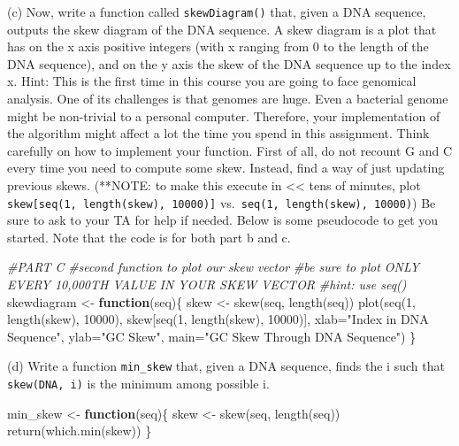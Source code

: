 \documentclass[
]{article}
\newenvironment{Shaded}{\begin{snugshade}}{\end{snugshade}}
\newcommand{\AttributeTok}[1]{\textcolor[rgb]{0.77,0.63,0.00}{#1}}
\newcommand{\CommentTok}[1]{\textcolor[rgb]{0.56,0.35,0.01}{\textit{#1}}}
\newcommand{\ControlFlowTok}[1]{\textcolor[rgb]{0.13,0.29,0.53}{\textbf{#1}}}
\newcommand{\DecValTok}[1]{\textcolor[rgb]{0.00,0.00,0.81}{#1}}
\newcommand{\FunctionTok}[1]{\textcolor[rgb]{0.00,0.00,0.00}{#1}}
\newcommand{\NormalTok}[1]{#1}
\newcommand{\OtherTok}[1]{\textcolor[rgb]{0.56,0.35,0.01}{#1}}
\newcommand{\StringTok}[1]{\textcolor[rgb]{0.31,0.60,0.02}{#1}}
\begin{document}
(c) Now, write a function called \texttt{skewDiagram()} that, given a
DNA sequence, outputs the skew diagram of the DNA sequence. A skew
diagram is a plot that has on the x axis positive integers (with x
ranging from 0 to the length of the DNA sequence), and on the y axis the
skew of the DNA sequence up to the index x. Hint: This is the first time
in this course you are going to face genomical analysis. One of its
challenges is that genomes are huge. Even a bacterial genome might be
non-trivial to a personal computer. Therefore, your implementation of
the algorithm might affect a lot the time you spend in this assignment.
Think carefully on how to implement your function. First of all, do not
recount G and C every time you need to compute some skew. Instead, find
a way of just updating previous skews. (**NOTE: to make this execute in
\textless\textless{} tens of minutes, plot
\texttt{skew{[}seq(1,\ length(skew),\ 10000){]}}
vs.~\texttt{seq(1,\ length(skew),\ 10000)}) Be sure to ask to your TA
for help if needed. Below is some pseudocode to get you started. Note
that the code is for both part b and c.\span 

\begin{Shaded}
\begin{Highlighting}[]
\CommentTok{\#PART C}
\CommentTok{\#second function to plot our skew vector}
\CommentTok{\#be sure to plot ONLY EVERY 10,000TH VALUE IN YOUR SKEW VECTOR }
  \CommentTok{\#hint: use seq()}
\NormalTok{skewdiagram }\OtherTok{\textless{}{-}} \ControlFlowTok{function}\NormalTok{(seq)\{}
\NormalTok{  skew }\OtherTok{\textless{}{-}} \FunctionTok{skew}\NormalTok{(seq, }\FunctionTok{length}\NormalTok{(seq))}
  \FunctionTok{plot}\NormalTok{(}\FunctionTok{seq}\NormalTok{(}\DecValTok{1}\NormalTok{, }\FunctionTok{length}\NormalTok{(skew), }\DecValTok{10000}\NormalTok{), skew[}\FunctionTok{seq}\NormalTok{(}\DecValTok{1}\NormalTok{, }\FunctionTok{length}\NormalTok{(skew), }\DecValTok{10000}\NormalTok{)], }\AttributeTok{xlab=}\StringTok{"Index in DNA Sequence"}\NormalTok{, }\AttributeTok{ylab=}\StringTok{"GC Skew"}\NormalTok{, }\AttributeTok{main=}\StringTok{"GC Skew Through DNA Sequence"}\NormalTok{)}
\NormalTok{\}}
\end{Highlighting}
\end{Shaded}

(d) Write a function \texttt{min\_skew} that, given a DNA sequence,
finds the i such that \texttt{skew(DNA,\ i)} is the minimum among
possible i. \span  

\begin{Shaded}
\begin{Highlighting}[]
\NormalTok{min\_skew }\OtherTok{\textless{}{-}} \ControlFlowTok{function}\NormalTok{(seq)\{}
\NormalTok{  skew }\OtherTok{\textless{}{-}} \FunctionTok{skew}\NormalTok{(seq, }\FunctionTok{length}\NormalTok{(seq))}
  \FunctionTok{return}\NormalTok{(}\FunctionTok{which.min}\NormalTok{(skew))}
\NormalTok{\}}
\end{Highlighting}
\end{Shaded}
\end{document}

